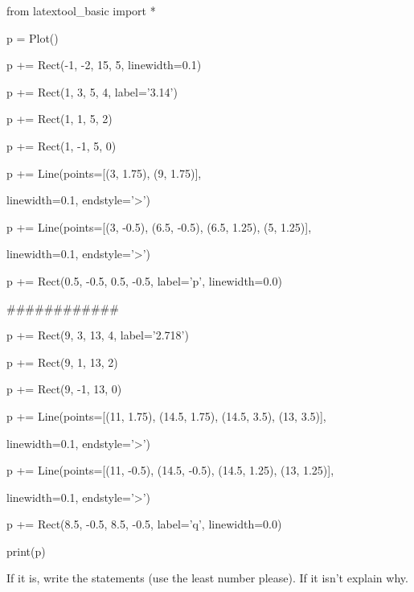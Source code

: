 \begin{python}

from latextool_basic import *

p = Plot()



p += Rect(-1, -2, 15, 5, linewidth=0.1)



p += Rect(1, 3, 5, 4, label='3.14')

p += Rect(1, 1, 5, 2)

p += Rect(1, -1, 5, 0)



p += Line(points=[(3, 1.75), (9, 1.75)],

          linewidth=0.1, endstyle='>')

p += Line(points=[(3, -0.5), (6.5, -0.5), (6.5, 1.25), (5, 1.25)],

          linewidth=0.1, endstyle='>')



p += Rect(0.5, -0.5, 0.5, -0.5, label='p', linewidth=0.0)

############



p += Rect(9, 3, 13, 4, label='2.718')

p += Rect(9, 1, 13, 2)

p += Rect(9, -1, 13, 0)



p += Line(points=[(11, 1.75), (14.5, 1.75), (14.5, 3.5), (13, 3.5)],

          linewidth=0.1, endstyle='>')

p += Line(points=[(11, -0.5), (14.5, -0.5), (14.5, 1.25), (13, 1.25)],

          linewidth=0.1, endstyle='>')



p += Rect(8.5, -0.5, 8.5, -0.5, label='q', linewidth=0.0)



print(p)

\end{python}



If it is, write the statements (use the least number please). If it isn't explain why.

